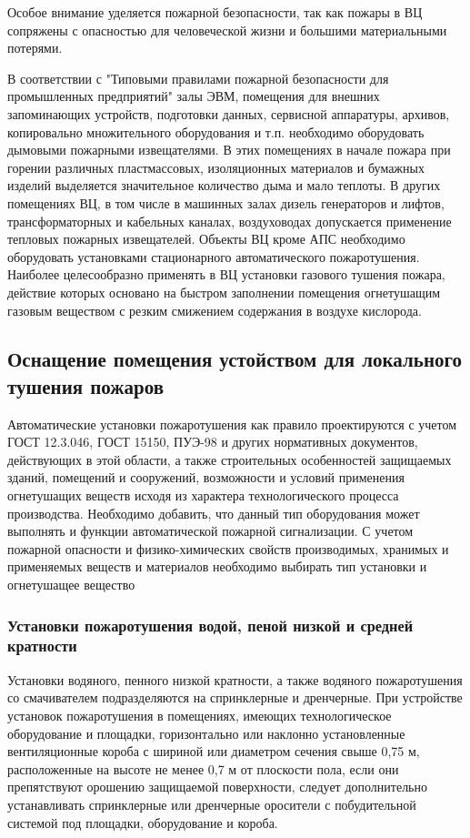 Особое внимание уделяется пожарной безопасности, так как пожары в ВЦ сопряжены с опасностью для человеческой
жизни и большими материальными потерями.

В соответствии с "Типовыми правилами пожарной безопасности для промышленных предприятий" залы ЭВМ, помещения
для внешних запоминающих устройств, подготовки данных, сервисной аппаратуры, архивов, копировально множительного
оборудования и т.п. необходимо оборудовать дымовыми пожарными извещателями. В этих помещениях в начале пожара
при горении различных пластмассовых, изоляционных материалов и бумажных изделий выделяется значительное количество
дыма и мало теплоты. В других помещениях ВЦ, в том числе в машинных залах дизель генераторов и лифтов, трансформаторных
и кабельных каналах, воздуховодах допускается применение тепловых пожарных извещателей. Объекты ВЦ кроме АПС необходимо
оборудовать установками стационарного автоматического пожаротушения. Наиболее целесообразно применять в ВЦ установки
газового тушения пожара, действие которых основано на быстром заполнении помещения огнетушащим газовым веществом с
резким смижением содержания в воздухе кислорода.

\subsection{Оснащение помещения устойством для локального тушения пожаров}
Автоматические установки пожаротушения как правило проектируются с учетом ГОСТ 12.3.046, ГОСТ 15150, ПУЭ-98 и других нормативных
документов, действующих в этой области, а также строительных особенностей защищаемых зданий, помещений и сооружений, возможности
и условий применения огнетушащих веществ исходя из характера технологического процесса производства.
Необходимо добавить, что данный тип оборудования может выполнять и функции автоматической пожарной сигнализации.
С учетом пожарной опасности и физико-химических свойств производимых, хранимых и применяемых веществ и материалов необходимо
выбирать тип установки и огнетушащее вещество

\subsubsection{Установки пожаротушения водой, пеной низкой и средней кратности}
Установки водяного, пенного низкой кратности, а также водяного пожаротушения со смачивателем подразделяются на спринклерные и дренчерные.
При устройстве установок пожаротушения в помещениях, имеющих технологическое оборудование и площадки, горизонтально или наклонно
установленные вентиляционные короба с шириной или диаметром сечения свыше 0,75 м, расположенные на высоте не менее 0,7 м от плоскости
пола, если они препятствуют орошению защищаемой поверхности, следует дополнительно устанавливать спринклерные или дренчерные
оросители с побудительной системой под площадки, оборудование и короба.

